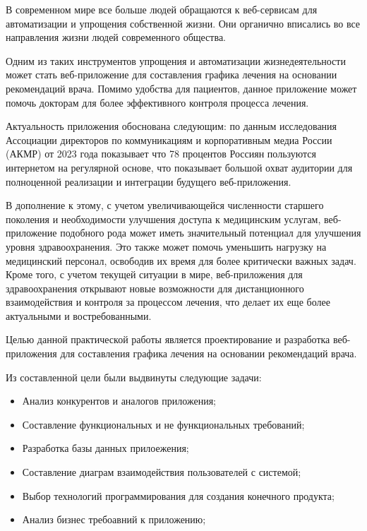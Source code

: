 \documentclass[14pt]{extreport}
\begin{document}
\pagestyle{empty} %

\pagestyle{plain} %

\tableofcontents
\intro 
    В современном мире все больше людей обращаются к веб-сервисам для %
    автоматизации и упрощения собственной жизни. Они органично вписались %
    во все направления жизни людей современного общества.  

    Одним из таких инструментов упрощения и автоматизации жизнедеятельности может %
    стать веб-приложение для составления графика лечения на основании рекомендаций %
    врача. Помимо удобства для пациентов, данное приложение может помочь докторам для %
    более эффективного контроля процесса лечения.

    Актуальность приложения обоснована следующим: по данным исследования Ассоциации директоров по коммуникациям и %
    корпоративным медиа России (АКМР)\cite{internet_users} от 2023 года показывает что 78 процентов %
    Россиян пользуются интернетом на регулярной основе, что показывает большой %
    охват аудитории для полноценной реализации и интеграции будущего веб-приложения.

    В дополнение к этому, с учетом увеличивающейся численности старшего поколения %
    и необходимости улучшения доступа к медицинским услугам, веб-приложение %
    подобного рода может иметь значительный потенциал для улучшения уровня %
    здравоохранения. Это также может помочь уменьшить нагрузку на медицинский %
    персонал, освободив их время для более критически важных задач. Кроме того, %
    с учетом текущей ситуации в мире, веб-приложения для здравоохранения открывают %
    новые возможности для дистанционного взаимодействия и контроля за процессом %
    лечения, что делает их еще более актуальными и востребованными.

    Целью данной практической работы является проектирование и разработка веб-приложения для составления графика лечения на %
    основании рекомендаций врача.

    Из составленной цели были выдвинуты следующие задачи:
        \begin{itemize}
            \item Анализ конкурентов и аналогов приложения;
            \item Составление функциональных и не функциональных требований;
            \item Разработка базы данных прилоежения;
            \item Составление диаграм взаимодействия пользователей с системой;
            \item Выбор технологий программирования для создания конечного продукта;
            \item Анализ бизнес требоавний к приложению;
        \end{itemize}
\end{document}

